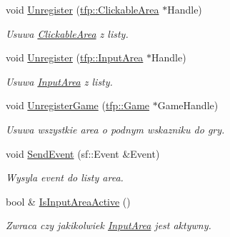 \begin{DoxyCompactItemize}
void \mbox{\hyperlink{classtfp_1_1_area_list_class_a329bbd6e39da431298b30030bf1aede9}{Unregister}} (\mbox{\hyperlink{classtfp_1_1_clickable_area}{tfp\+::\+Clickable\+Area}} $\ast$Handle)
\begin{DoxyCompactList}\small\item\em Usuwa \mbox{\hyperlink{classtfp_1_1_clickable_area}{Clickable\+Area}} z listy. \end{DoxyCompactList}\item 
\mbox{\label{classtfp_1_1_area_list_class_a5cfb1fe8816f0e9ab5ce93959b61b352}} 
void \mbox{\hyperlink{classtfp_1_1_area_list_class_a5cfb1fe8816f0e9ab5ce93959b61b352}{Unregister}} (\mbox{\hyperlink{classtfp_1_1_input_area}{tfp\+::\+Input\+Area}} $\ast$Handle)
\begin{DoxyCompactList}\small\item\em Usuwa \mbox{\hyperlink{classtfp_1_1_input_area}{Input\+Area}} z listy. \end{DoxyCompactList}\item 
\mbox{\label{classtfp_1_1_area_list_class_a4bfdd8b999eef40ae17c11080171fd2e}} 
void \mbox{\hyperlink{classtfp_1_1_area_list_class_a4bfdd8b999eef40ae17c11080171fd2e}{Unregister\+Game}} (\mbox{\hyperlink{classtfp_1_1_game}{tfp\+::\+Game}} $\ast$Game\+Handle)
\begin{DoxyCompactList}\small\item\em Usuwa wszystkie area o podnym wskazniku do gry. \end{DoxyCompactList}\item 
\mbox{\label{classtfp_1_1_area_list_class_ac47571d4a8bc9b9a0be9e89f0c115cd6}} 
void \mbox{\hyperlink{classtfp_1_1_area_list_class_ac47571d4a8bc9b9a0be9e89f0c115cd6}{Send\+Event}} (sf\+::\+Event \&Event)
\begin{DoxyCompactList}\small\item\em Wysyla event do listy area. \end{DoxyCompactList}\item 
\mbox{\label{classtfp_1_1_area_list_class_ac3aae0d5a779a014bc27b26473c71a67}} 
bool \& \mbox{\hyperlink{classtfp_1_1_area_list_class_ac3aae0d5a779a014bc27b26473c71a67}{Is\+Input\+Area\+Active}} ()
\begin{DoxyCompactList}\small\item\em Zwraca czy jakikolwiek \mbox{\hyperlink{classtfp_1_1_input_area}{Input\+Area}} jest aktywny. \end{DoxyCompactList}\item 

\end{DoxyCompactItemize}
